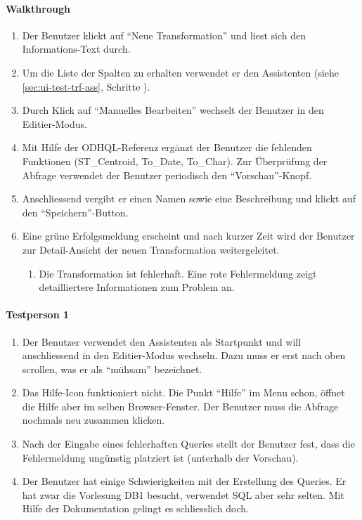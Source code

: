 \paragraph{Walkthrough}
\begin{enumerate}
\item Der Benutzer klickt auf ``Neue Transformation'' und liest sich den Informations-Text durch.
\item Um die Liste der Spalten zu erhalten verwendet er den Assistenten (siehe \cref{sec:ui-test-trf-ass}, Schritte ).
\item Durch Klick auf ``Manuelles Bearbeiten'' wechselt der Benutzer in den Editier-Modus.
\item Mit Hilfe der ODHQL-Referenz ergänzt der Benutzer die fehlenden Funktionen (ST\_Centroid, To\_Date, To\_Char). Zur Überprüfung der Abfrage verwendet der Benutzer periodisch den ``Vorschau''-Knopf.
\item Anschliessend vergibt er einen Namen sowie eine Beschreibung und klickt auf den ``Speichern''-Button.
\item Eine grüne Erfolgsmeldung erscheint und nach kurzer Zeit wird der Benutzer zur Detail-Ansicht der neuen Transformation weitergeleitet.
  \begin{enumerate}[label=\labelenumi\alph*.]
  \item Die Transformation ist fehlerhaft. Eine rote Fehlermeldung zeigt detailliertere Informationen zum Problem an.
  \end{enumerate}
\end{enumerate}

\paragraph{Testperson 1}
\begin{enumerate}
\item Der Benutzer verwendet den Assistenten als Startpunkt und will anschliessend in den Editier-Modus wechseln. Dazu muss er erst nach oben scrollen, was er als ``mühsam'' bezeichnet.
\item Das Hilfe-Icon funktioniert nicht. Die Punkt ``Hilfe'' im Menu schon, öffnet die Hilfe aber im selben Browser-Fenster. Der Benutzer muss die Abfrage nochmals neu zusammen klicken.
\item Nach der Eingabe eines fehlerhaften Queries stellt der Benutzer fest, dass die Fehlermeldung ungünstig platziert ist (unterhalb der Vorschau).
\item Der Benutzer hat einige Schwierigkeiten mit der Erstellung des Queries. Er hat zwar die Vorlesung DB1 besucht, verwendet SQL aber sehr selten. Mit Hilfe der Dokumentation gelingt es schliesslich doch.
\end{enumerate}

